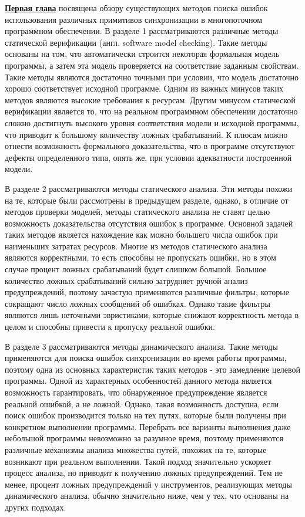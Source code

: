 \underline{\textbf{Первая глава}} посвящена обзору существующих методов поиска ошибок использования различных примитивов синхронизации в многопоточном программном обеспечении.
В разделе 1 рассматриваются различные методы статической верификации (англ. software model checking).
Такие методы основаны на том, что автоматически строится некоторая формальная модель программы, а затем эта модель проверяется на соответствие заданным свойствам.
Такие методы являются достаточно точными при условии, что модель достаточно хорошо соответствует исходной программе.
Одним из важных минусов таких методов являются высокие требования к ресурсам.
Другим минусом статической верификации является то, что на реальном программном обеспечении достаточно сложно достигнуть высокого уровня соответствия модели и исходной программы, что приводит к большому количеству ложных срабатываний.
К плюсам можно отнести возможность формального доказательства, что в программе отсутствуют дефекты определенного типа, опять же, при условии адекватности построенной модели.

В разделе 2 рассматриваются методы статического анализа.
Эти методы похожи на те, которые были рассмотрены в предыдущем разделе, однако, в отличие от методов проверки моделей, методы статического анализа не ставят целью возможность доказательства отсутствия ошибок в программе.
Основной задачей таких методов является нахождение как можно большего числа ошибок при наименьших затратах ресурсов. 
Многие из методов статического анализа являются корректными, то есть способны не пропускать ошибки, но в этом случае процент ложных срабатываний будет слишком большой.
Большое количество ложных срабатываний сильно затрудняет ручной анализ предупреждений, поэтому зачастую применяются различные фильтры, которые сокращают число ложных сообщений об ошибках.
Однако такие фильтры являются лишь неточными эвристиками, которые снижают корректность метода в целом и способны привести к пропуску реальной ошибки.

В разделе 3 рассматриваются методы динамического анализа.
Такие методы применяются для поиска ошибок синхронизации во время работы программы, поэтому одна из основных характеристик таких методов - это замедление целевой программы. 
Одной из характерных особенностей данного метода является возможность гарантировать, что обнаруженное предупреждение является реальной ошибкой, а не ложной. 
Однако, такая возможность доступна, если поиск ошибок производится только на тех путях, которые были получены при конкретном выполнении программы.
Перебрать все варианты выполнения даже небольшой программы невозможно за разумное время, поэтому применяются различные механизмы анализа множества путей, похожих на те, которые возникают при реальном выполнении.
Такой подход значительно ускоряет процесс анализа, но приводит к получению ложных предупреждений. 
Тем не менее, процент ложных предупреждений у инструментов, реализующих методы динамического анализа, обычно значительно ниже, чем у тех, что основаны на других подходах.

